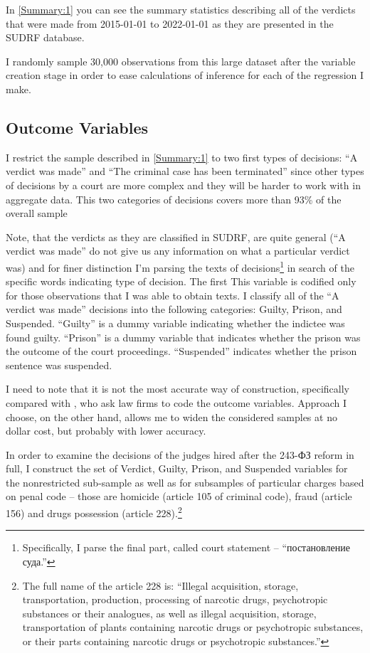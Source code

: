 \documentclass[12pt]{article}
\numberwithin{equation}{section}
\numberwithin{table}{section}
\numberwithin{figure}{section}
\begin{document}
In \vref{Summary:1} you can see the summary statistics describing all of the verdicts that were made from 2015-01-01 to 2022-01-01 as they are presented in the SUDRF database. 


I randomly sample 30,000 observations from this large dataset after the variable creation stage in order to ease calculations of inference for each of the regression I make. 


\subsection{Outcome Variables}

I restrict the sample described in \vref{Summary:1} to two first types of decisions: ``A verdict was made'' and ``The criminal case has been terminated'' since other types of decisions by a court are more complex and they will be harder to work with in aggregate data. 
This two categories of decisions covers more than 93\% of the overall sample


Note, that the verdicts as they are classified in SUDRF, are quite general (``A verdict was made'' do not give us any information on what a particular verdict was) and for finer distinction I'm parsing the texts of decisions\footnote{Specifically, I parse the final part, called court statement -- ``постановление суда.''} in search of the specific words indicating type of decision.  
The first 
This variable is codified only for those observations that I was able to obtain texts.
I classify all of the ``A verdict was made'' decisions into the following categories: Guilty, Prison, and Suspended. 
``Guilty'' is a dummy variable indicating whether the indictee was found guilty. 
``Prison'' is a dummy variable that indicates whether the prison was the outcome of the court proceedings.
``Suspended'' indicates whether the prison sentence was suspended.

I need to note that it is not the most accurate way of construction, specifically compared with \citet{Mehmood2022,LaPorta2008,Djankov2003}, who ask law firms to code the outcome variables. 
Approach I choose, on the other hand, allows me to widen the considered samples at no dollar cost, but probably with lower accuracy.

In order to examine the decisions of the judges hired after the 243-ФЗ reform in full, I construct the set of Verdict, Guilty, Prison, and Suspended variables for the nonrestricted sub-sample as well as for subsamples of particular charges based on penal code -- those are homicide (article 105 of criminal code), fraud (article 156) and drugs possession (article 228).\footnote{The full name of the article 228 is: ``Illegal acquisition, storage, transportation, production, processing of narcotic drugs, psychotropic substances or their analogues, as well as illegal acquisition, storage, transportation of plants containing narcotic drugs or psychotropic substances, or their parts containing narcotic drugs or psychotropic substances.''}
\end{document}
